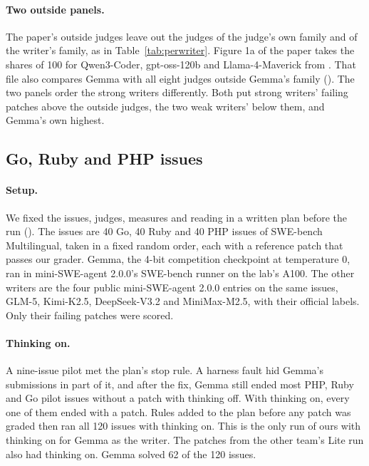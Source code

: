 \documentclass[10pt,letterpaper]{article}
\begin{document}
\paragraph{Two outside panels.} The paper's outside judges leave out the judges of the judge's own family and of
the writer's family, as in Table~\ref{tab:perwriter}. Figure 1a of the paper takes the shares of 100 for Qwen3-Coder,
gpt-oss-120b and Llama-4-Maverick from . That file also compares Gemma with
all eight judges outside Gemma's family (). The two panels order the strong writers
differently. Both put strong writers' failing patches above the outside judges, the two weak writers' below them, and
Gemma's own highest.

\subsection*{Go, Ruby and PHP issues}

\paragraph{Setup.} We fixed the issues, judges, measures and reading in a written plan before the run
(). The issues are 40 Go, 40 Ruby and 40 PHP issues of SWE-bench Multilingual,
taken in a fixed random order, each with a reference patch that passes our grader. Gemma, the 4-bit competition
checkpoint at temperature 0, ran in mini-SWE-agent 2.0.0's SWE-bench runner on the lab's A100. The other writers are
the four public mini-SWE-agent 2.0.0 entries on the same issues, GLM-5, Kimi-K2.5, DeepSeek-V3.2 and MiniMax-M2.5,
with their official labels. Only their failing patches were scored.

\paragraph{Thinking on.} A nine-issue pilot met the plan's stop rule. A harness fault hid Gemma's submissions in part of
it, and after the fix, Gemma still ended most PHP, Ruby and Go pilot issues without a patch with thinking off. With
thinking on, every one of them ended with a patch. Rules added to the plan before any patch was graded then ran all
120 issues with thinking on. This is the only run of ours with thinking on for Gemma as the writer. The patches from
the other team's Lite run also had thinking on. Gemma solved 62 of the 120 issues.
\end{document}
